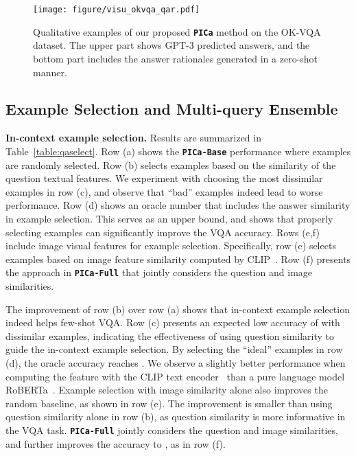\begin{figure*}[t]
\begin{center}
  \centerline{\texttt{[image: figure/visu\_okvqa\_qar.pdf]}}
\end{center}
\vspace{-0.3in}
    \caption{\small Qualitative examples of our proposed \textbf{\texttt{PICa}} method on the OK-VQA dataset. The upper part shows GPT-3 predicted answers, and the bottom part includes the answer rationales generated in a zero-shot manner.
	}
\vspace{-0.1in}
\label{fig:okvisu}
\end{figure*}


\subsection{Example Selection and Multi-query Ensemble}
\noindent\textbf{In-context example selection.}
Results are summarized in Table~\ref{table:qaselect}. 
Row (a) shows the \textbf{\texttt{PICa-Base}} performance where examples are randomly selected. Row (b) selects examples based on the similarity of the question textual features. We experiment with choosing the most dissimilar examples in row (c), and observe that ``bad'' examples indeed lead to worse performance. Row (d) shows an oracle number that includes the answer similarity in example selection. This serves as an upper bound, and shows that properly selecting examples can significantly improve the VQA accuracy. Rows (e,f) include image visual features for example selection. Specifically, row (e) selects examples based on image feature similarity computed by CLIP~\cite{radford2021learning}. Row (f) presents the approach in \textbf{\texttt{PICa-Full}} that jointly considers the question and image similarities. 

The improvement of row (b) over row (a) shows that in-context example selection indeed helps few-shot VQA. Row (c) presents an expected low accuracy of  with dissimilar examples, indicating the effectiveness of using question similarity to guide the in-context example selection. By selecting the ``ideal'' examples in row (d), the oracle accuracy reaches . We observe a slightly better performance when computing the feature with the CLIP text encoder~\cite{radford2021learning} than a pure language model RoBERTa~\cite{liu2019roberta}. 
Example selection with image similarity alone also improves the random baseline, as shown in row (e). The improvement is smaller than using question similarity alone in row (b), as question similarity is more informative in the VQA task. \textbf{\texttt{PICa-Full}} jointly considers the question and image similarities, and further improves the accuracy to , as in row (f).



